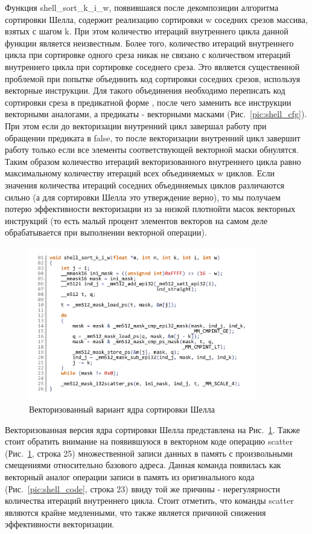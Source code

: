 \documentclass[utf8]{psta}
\begin{document}
Функция shell\_sort\_k\_i\_w, появившаяся после декомпозиции алгоритма сортировки Шелла, содержит реализацию сортировки w соседних срезов массива, взятых с шагом k. 
При этом количество итераций внутреннего цикла данной функции является неизвестным. 
Более того, количество итераций внутреннего цикла при сортировке одного среза никак не связано с количеством итераций внутреннего цикла при сортировке соседнего среза. 
Это является существенной проблемой при попытке объединить код сортировки соседних срезов, используя векторные инструкции. 
Для такого объединения необходимо переписать код сортировки среза в предикатной форме \cite{Volkonskyi}, после чего заменить все инструкции векторными аналогами, а предикаты - векторными масками (Рис.~\ref{pic:shell_cfg}). 
При этом если до векторизации внутренний цикл завершал работу при обращении предиката в false, то после векторизации внутренний цикл завершит работу только если все элементы соответствующей векторной маски обнулятся. 
Таким образом количество итераций векторизованного внутреннего цикла равно максимальному количеству итераций всех объединяемых w циклов. 
Если значения количества итераций соседних объединяемых циклов различаются сильно (а для сортировки Шелла это утверждение верно), то мы получаем потерю эффективности векторизации из за низкой плотнойти масок векторных инструкций (то есть малый процент элементов векторов на самом деле обрабатывается при выполнении векторной операции).

\begin{figure}
\includegraphics[width=10cm]{pics/pic_shell_code_vect}
\caption{Векторизованный вариант ядра сортировки Шелла}
\label{pic:shell_code_vect}
\end{figure}

Векторизованная версия ядра сортировки Шелла представлена на Рис.~\ref{pic:shell_code_vect}. 
Также стоит обратить внимание на появившуюся в векторном коде операцию scatter (Рис.~\ref{pic:shell_code_vect}, строка 25) множественной записи данных в память с произвольными смещениями относительно базового адреса. 
Данная команда появилась как векторный аналог операции записи в память из оригинального кода (Рис.~\ref{pic:shell_code}, строка 23) ввиду той же причины - нерегулярности количества итераций внутреннего цикла. 
Стоит отметить, что команды scatter являются крайне медленными, что также является причиной снижения эффективности векторизации.
\end{document}
